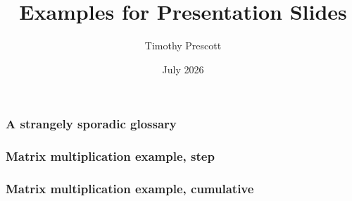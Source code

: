 \documentclass{ltx-talk}
\title{Examples for Presentation Slides}
\author{Timothy Prescott}
\date{July 2026}
\begin{document}
\newlength\mylabelwidth
\setlength{}
\begin{frame}
 \frametitle{A strangely sporadic glossary}\vspace{-5ex}

\end{frame}

\begin{frame}[tag-slides=1-]
\frametitle{Matrix multiplication example,
 step }\vspace{-5ex}

\end{frame}

\begin{frame}
\frametitle{Matrix multiplication example,
 cumulative}\vspace{-5ex}

\end{frame}

\end{document}
